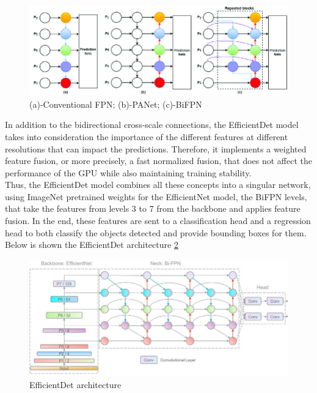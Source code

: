 \begin{figure}[ht!]
    \centering
    \includegraphics[width=1\textwidth]{figures/Figure6.png}
    \caption{(a)-Conventional FPN; (b)-PANet; (c)-BiFPN}
    \label{fig:fig6}
\end{figure}
In addition to the bidirectional cross-scale connections, the EfficientDet model takes into consideration the importance of the different features at different resolutions that can impact the predictions. Therefore, it implements a weighted feature fusion, or more precisely, a fast normalized fusion, that does not affect the performance of the GPU while also maintaining training stability.~\cite{carte8}\\
Thus, the EfficientDet model combines all these concepts into a singular network, using ImageNet pretrained weights for the EfficientNet model, the BiFPN levels, that take the features from levels 3 to 7 from the backbone and applies feature fusion. In the end, these features are sent to a classification head and a regression head to both classify the objects detected and provide bounding boxes for them. Below is shown the EfficientDet architecture \ref{fig:fig7}\\
\begin{figure}[h!]
    \centering
    \includegraphics[width=1\textwidth]{figures/Figure7.jpg}
    \caption{EfficientDet architecture}
    \label{fig:fig7}
\end{figure}